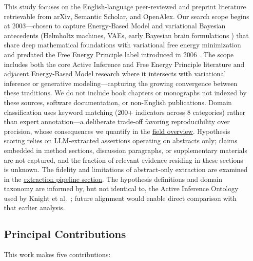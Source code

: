 \documentclass[
  english,
]{article}
\begin{document}
This study focuses on the English-language peer-reviewed and preprint
literature retrievable from arXiv, Semantic Scholar, and OpenAlex. Our
search scope begins at 2003---chosen to capture Energy-Based Model and
variational Bayesian antecedents (Helmholtz machines, VAEs, early
Bayesian brain formulations
\citep{dayan1995helmholtz, lecun2006tutorial}) that share deep
mathematical foundations with variational free energy minimization and
predated the Free Energy Principle label introduced in 2006
\citep{friston2006free}. The scope includes both the core Active
Inference and Free Energy Principle literature and adjacent Energy-Based
Model research where it intersects with variational inference or
generative modeling---capturing the growing convergence between these
traditions. We do not include book chapters or monographs not indexed by
these sources, software documentation, or non-English publications.
Domain classification uses keyword matching (200+ indicators across 8
categories) rather than expert annotation---a deliberate trade-off
favoring reproducibility over precision, whose consequences we quantify
in the \hyperref[sec:field_overview]{field overview}. Hypothesis scoring
relies on LLM-extracted assertions operating on abstracts only; claims
embedded in method sections, discussion paragraphs, or supplementary
materials are not captured, and the fraction of relevant evidence
residing in these sections is unknown. The fidelity and limitations of
abstract-only extraction are examined in the
\hyperref[sec:extraction_pipeline]{extraction pipeline section}. The
hypothesis definitions and domain taxonomy are informed by, but not
identical to, the Active Inference Ontology used by Knight et
al.~\citep{knight2022fep}; future alignment would enable direct
comparison with that earlier analysis.

\subsection{Principal Contributions}\label{principal-contributions}

This work makes five contributions:
\end{document}
